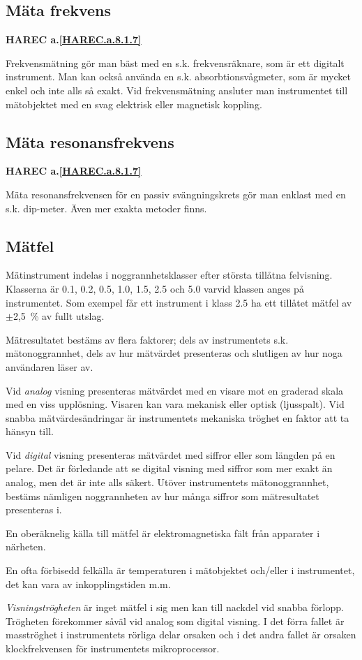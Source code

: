 \subsection{Mäta frekvens}
\textbf{
HAREC a.\ref{HAREC.a.8.1.7}\label{myHAREC.a.8.1.7}
}

Frekvensmätning gör man bäst med en s.k. frekvensräknare, som är ett
digitalt instrument.  Man kan också använda en
s.k. absorbtionsvågmeter, som är mycket enkel och inte alls så exakt.
Vid frekvensmätning ansluter man instrumentet till mätobjektet med en
svag elektrisk eller magnetisk koppling.

\subsection{Mäta resonansfrekvens}
\textbf{
HAREC a.\ref{HAREC.a.8.1.7}\label{myHAREC.a.8.1.7}
}

Mäta resonansfrekvensen för en passiv svängningskrets gör man enklast
med en s.k. dip-meter. Även mer exakta metoder finns.


\subsection{Mätfel}

Mätinstrument indelas i noggrannhetsklasser efter största tillåtna
felvisning. Klasserna är 0.1, 0.2, 0.5, 1.0, 1.5, 2.5 och 5.0 varvid
klassen anges på instrumentet. Som exempel får ett instrument i klass
2.5 ha ett tillåtet mätfel av \(\pm\)2,5~\% av fullt utslag.

Mätresultatet bestäms av flera faktorer; dels av instrumentets
s.k. mätonoggrannhet, dels av hur mätvärdet presenteras och slutligen
av hur noga användaren läser av.

Vid \emph{analog} visning presenteras mätvärdet med en visare mot en
graderad skala med en viss upplösning. Visaren kan vara mekanisk eller
optisk (ljusspalt). Vid snabba mätvärdesändringar är instrumentets
mekaniska tröghet en faktor att ta hänsyn till.

Vid \emph{digital} visning presenteras mätvärdet med siffror eller som
längden på en pelare. Det är förledande att se digital visning med
siffror som mer exakt än analog, men det är inte alls säkert. Utöver
instrumentets mätonoggrannhet, bestäms nämligen noggrannheten av hur
många siffror som mätresultatet presenteras i.

En oberäknelig källa till mätfel är elektromagnetiska fält från
apparater i närheten.

En ofta förbisedd felkälla är temperaturen i mätobjektet och/eller i
instrumentet, det kan vara av inkopplingstiden m.m.

\emph{Visningströgheten} är inget mätfel i sig men kan till nackdel
vid snabba förlopp. Trögheten förekommer såväl vid analog som digital
visning. I det förra fallet är masströghet i instrumentets rörliga
delar orsaken och i det andra fallet är orsaken klockfrekvensen för
instrumentets mikroprocessor.
